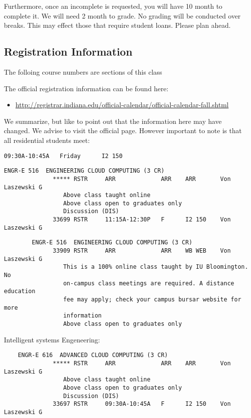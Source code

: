 \begin{itemize}
Furthermore, once an incomplete is requested, you will have 10 month to
complete it. We will need 2 month to grade. No grading will be conducted
over breaks. This may effect those that require student loans. Please
plan ahead.

\subsection{Registration Information}\label{registration-information}

The folloing course numbers are sections of this class

The official registration information can be found here:

\begin{itemize}
\tightlist
\item
  \url{http://registrar.indiana.edu/official-calendar/official-calendar-fall.shtml}
\end{itemize}

We summarize, but like to point out that the information here may have
changed. We advise to visit the official page. However important to note
is that all residential students meet:

\begin{verbatim}
09:30A-10:45A   Friday      I2 150 
\end{verbatim}


\begin{verbatim}
ENGR-E 516  ENGINEERING CLOUD COMPUTING (3 CR)
              ***** RSTR     ARR             ARR    ARR       Von Laszewski G
                 Above class taught online
                 Above class open to graduates only
                 Discussion (DIS)
              33699 RSTR     11:15A-12:30P   F      I2 150    Von Laszewski G
\end{verbatim}

\begin{verbatim}
        ENGR-E 516  ENGINEERING CLOUD COMPUTING (3 CR)
              33909 RSTR     ARR             ARR    WB WEB    Von Laszewski G
                 This is a 100% online class taught by IU Bloomington. No
                 on-campus class meetings are required. A distance education
                 fee may apply; check your campus bursar website for more
                 information
                 Above class open to graduates only
\end{verbatim}

Intelligent systems Engeneering:

\begin{verbatim}
	ENGR-E 616  ADVANCED CLOUD COMPUTING (3 CR)
              ***** RSTR     ARR             ARR    ARR       Von Laszewski G
                 Above class taught online
                 Above class open to graduates only
                 Discussion (DIS)
              33697 RSTR     09:30A-10:45A   F      I2 150    Von Laszewski G
\end{verbatim}


\end{itemize}
